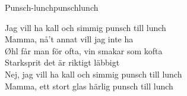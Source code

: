 \begin{song}{Punsch-lunch}{punschlunch}
\begin{vers}
Jag vill ha kall och simmig punsch till lunch\\
Mamma, nå't annat vill jag inte ha\\
Øhl får man för ofta, vin smakar som kofta\\
Starksprit det är riktigt läbbigt\\
Nej, jag vill ha kall och simmig punsch till lunch\\
Mamma, ett stort glas härlig punsch till lunch\\
\end{vers}
\end{song}
